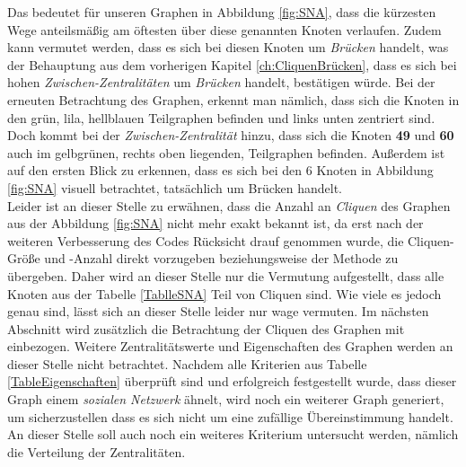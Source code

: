 Das bedeutet für unseren Graphen in Abbildung \ref{fig:SNA}, dass die kürzesten Wege anteilsmäßig am öftesten über diese genannten Knoten verlaufen. Zudem kann vermutet werden, dass es sich bei diesen Knoten um \textit{Brücken} handelt, was der Behauptung aus dem vorherigen Kapitel \ref{ch:CliquenBrücken}, dass es sich bei hohen \textit{Zwischen-Zentralitäten} um \textit{Brücken} handelt, bestätigen würde. Bei der erneuten Betrachtung des Graphen, erkennt man nämlich, dass sich die Knoten in den grün, lila, hellblauen Teilgraphen befinden und links unten zentriert sind. Doch kommt bei der \textit{Zwischen-Zentralität} hinzu, dass sich die Knoten \textbf{49} und \textbf{60} auch im gelbgrünen, rechts oben liegenden, Teilgraphen befinden. Außerdem ist auf den ersten Blick zu erkennen, dass es sich bei den 6 Knoten in Abbildung \ref{fig:SNA} visuell betrachtet, tatsächlich um Brücken handelt. \\

Leider ist an dieser Stelle zu erwähnen, dass die Anzahl an \textit{Cliquen} des Graphen aus der Abbildung \ref{fig:SNA} nicht mehr exakt bekannt ist, da erst nach der weiteren Verbesserung des Codes Rücksicht drauf genommen wurde, die Cliquen-Größe und -Anzahl direkt vorzugeben beziehungsweise der Methode zu übergeben. Daher wird an dieser Stelle nur die Vermutung aufgestellt, dass alle Knoten aus der Tabelle \ref{TablleSNA} Teil von Cliquen sind. Wie viele es jedoch genau sind, lässt sich an dieser Stelle leider nur wage vermuten. Im nächsten Abschnitt wird zusätzlich die Betrachtung der Cliquen des Graphen mit einbezogen. Weitere Zentralitätswerte und Eigenschaften des Graphen werden an dieser Stelle nicht betrachtet. Nachdem alle Kriterien aus Tabelle \ref{TableEigenschaften} überprüft sind und erfolgreich festgestellt wurde, dass dieser Graph einem \textit{sozialen Netzwerk} ähnelt, wird noch ein weiterer Graph generiert, um sicherzustellen dass es sich nicht um eine zufällige Übereinstimmung handelt. An dieser Stelle soll auch noch ein weiteres Kriterium untersucht werden, nämlich die Verteilung der Zentralitäten.


\newpage
